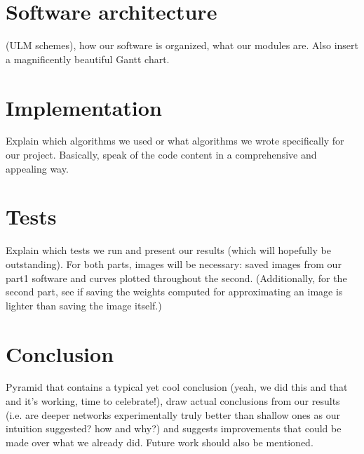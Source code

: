 \documentclass[a4paper]{article}
\begin{document}
\section{Software architecture}
(ULM schemes), how our software is organized, what our modules are. Also insert a magnificently beautiful Gantt chart.

\section{Implementation}
Explain which algorithms we used or what algorithms we wrote specifically for our project. Basically, speak of the code content in a comprehensive and appealing way.

\section{Tests}
Explain which tests we run and present our results (which will hopefully be outstanding). For both parts, images will be necessary: saved images from our part1 software and curves plotted throughout the second. (Additionally, for the second part, see if saving the weights computed for approximating an image is lighter than saving the image itself.)


\section{Conclusion}
Pyramid that contains a typical yet cool conclusion (yeah, we did this and that and it's working, time to celebrate!), draw actual conclusions from our results (i.e. are deeper networks experimentally truly better than shallow ones as our intuition suggested? how and why?) and suggests improvements that could be made over what we already did. Future work should also be mentioned.



\end{document}
